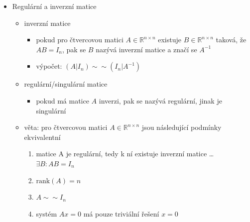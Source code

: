 \begin{itemize}
\begin{itemize}
\begin{itemize}
\end{itemize}
\item transponovaná matice
\begin{itemize}
\item transponovaná matice k matici $A \in \mathbb{R}^{m\times n}$ je matice $A^T \in \mathbb R^{n\times m}$ splňující $(A^T)_{i,j}=a_{j,i}$
\end{itemize}
\item symetrická matice
\begin{itemize}
\item čtvercová matice A je symetrická, pokud $A^T =A$, tedy $a_{i,j}=a_{j,i}$
\end{itemize}
\item maticový součin
\begin{itemize}
\item pro $A \in \mathbb R^{m\times n},B\in \mathbb R^{n\times p}$ je součin $(AB) \in \mathbb R^{m\times p}$ definován $(AB)_{i,j}=\sum^{n}_{k=1}a_{i,k}b_{k,j}$
\end{itemize}
\end{itemize}
\item Regulární a inverzní matice
\begin{itemize}
\item inverzní matice
\begin{itemize}
\item pokud pro čtvercovou matici $A \in \mathbb R^{n\times n}$ existuje $B \in \mathbb R^{n\times n}$ taková, že $AB=I_n$, pak se $B$ nazývá inverzní matice a značí se $A^{-1}$
\item výpočet: $(A|I_n)\sim\sim (I_n|A^{-1})$
\end{itemize}
\item regulární/singulární matice
\begin{itemize}
\item pokud má matice $A$ inverzi, pak se nazývá regulární, jinak je singulární
\end{itemize}
\item věta: pro čtvercovou matici $A \in \mathbb R^{n\times n}$ jsou následující podmínky ekvivalentní
\begin{enumerate}
\item matice A je regulární, tedy k ní existuje inverzní matice \dots{} $\exists B: AB=I_n$
\item $\text{rank}(A) = n$
\item $A\sim\sim I_n$
\item systém $Ax = 0$ má pouze triviální řešení $x = 0$

\end{enumerate}
\end{itemize}
\end{itemize}
